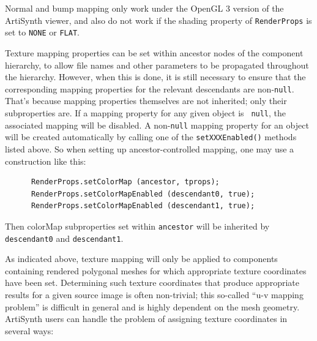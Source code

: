 \begin{sideblock}
Normal and bump mapping only work under the OpenGL 3 version of the
ArtiSynth viewer, and also do not work if the {\sf shading} property
of {\tt RenderProps} is set to {\tt NONE} or {\tt FLAT}.
\end{sideblock}

\begin{sideblock}
Texture mapping properties can be set within ancestor nodes of the
component hierarchy, to allow file names and other parameters to be
propagated throughout the hierarchy. However, when this is done, it is
still necessary to ensure that the corresponding mapping
properties for the relevant descendants are non-{\tt null}.  That's
because mapping properties themselves are not inherited; only their
subproperties are. If a mapping property for any given object is {\tt
null}, the associated mapping will be disabled. A non-{\tt null}
mapping property for an object will be created automatically by
calling one of the {\tt setXXXEnabled()} methods listed above.  So 
when setting up ancestor-controlled mapping, one may use a
construction like this:
%
\begin{verbatim}
      RenderProps.setColorMap (ancestor, tprops);
      RenderProps.setColorMapEnabled (descendant0, true);
      RenderProps.setColorMapEnabled (descendant1, true);
\end{verbatim}
%
Then {\sf colorMap} subproperties set within {\tt ancestor} will
be inherited by {\tt descendant0} and {\tt descendant1}.
\end{sideblock}

As indicated above, texture mapping will only be applied to components
containing rendered polygonal meshes for which appropriate texture
coordinates have been set. Determining such texture coordinates that
produce appropriate results for a given source image is often
non-trivial; this so-called ``u-v mapping problem'' is difficult in
general and is highly dependent on the mesh geometry. ArtiSynth users
can handle the problem of assigning texture coordinates in several
ways:

